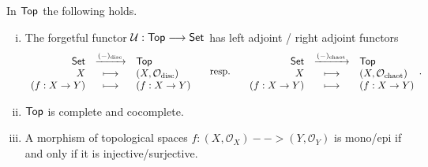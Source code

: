 \begin{lemma}
	In $\textsf{Top}$ the following holds.
	\begin{enumerate}[(i)]
		\item{
			The forgetful functor $\mathcal{U}:\textsf{Top} --> \textsf{Set}$ has left adjoint / right adjoint functors
			\begin{equation*}
				\begin{array}{rcl}
					\textsf{Set} & \xrightarrow{(-)_\text{disc}} & \textsf{Top}\\
					X & \longmapsto & (X,\mathcal{O}_\text{disc})\\
					(f:X \rightarrow Y) & \longmapsto & (f:X \rightarrow Y)
				\end{array}
				\hspace{.5cm}\text{resp.}\hspace{.5cm}
				\begin{array}{rcl}
					\textsf{Set} & \xrightarrow{(-)_\text{chaot}} & \textsf{Top}\\
					X & \longmapsto & (X,\mathcal{O}_\text{chaot})\\
					(f:X \rightarrow Y) & \longmapsto & (f:X \rightarrow Y)
				\end{array}.
			\end{equation*}
		}
		\item{
			$\textsf{Top}$ is complete and cocomplete.
		}
		\item{
			A morphism of topological spaces $f:(X,\mathcal{O}_X)-->(Y,\mathcal{O}_Y)$ is mono/epi if and only if it is injective/surjective.
		}
	\end{enumerate}
\end{lemma}
